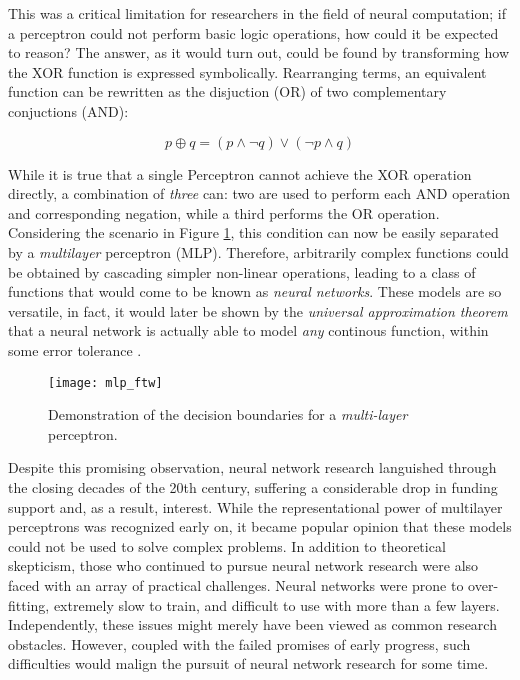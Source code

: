 This was a critical limitation for researchers in the field of neural computation; if a perceptron could not perform basic logic operations, how could it be expected to reason?
The answer, as it would turn out, could be found by transforming how the XOR function is expressed symbolically.
Rearranging terms, an equivalent function can be rewritten as the disjuction (OR) of two complementary conjuctions (AND):

\begin{equation}
\label{eq:xor}
p \oplus q = (p \wedge \neg q) \vee (\neg p \wedge q)
\end{equation}

\noindent While it is true that a single Perceptron cannot achieve the XOR operation directly, a combination of \emph{three} can: two are used to perform each AND operation and corresponding negation, while a third performs the OR operation.
Considering the scenario in Figure \ref{fig:mlp_ftw}, this condition can now be easily separated by a \emph{multilayer} perceptron (MLP).
Therefore, arbitrarily complex functions could be obtained by cascading simpler non-linear operations, leading to a class of functions that would come to be known as \emph{neural networks}.
These models are so versatile, in fact, it would later be shown by the \emph{universal approximation theorem} that a neural network is actually able to model \emph{any} continous function, within some error tolerance \cite{Cybenko1989, Hornik1991}.

\begin{figure}
\begin{centering}
\texttt{[image: mlp\_ftw]}
\caption{Demonstration of the decision boundaries for a \emph{multi-layer} perceptron.}
\label{fig:mlp_ftw}
\end{centering}
\end{figure}

Despite this promising observation, neural network research languished through the closing decades of the 20th century, suffering a considerable drop in funding support and, as a result, interest.
While the representational power of multilayer perceptrons was recognized early on, it became popular opinion that these models could not be used to solve complex problems.
In addition to theoretical skepticism, those who continued to pursue neural network research were also faced with an array of practical challenges.
Neural networks were prone to over-fitting, extremely slow to train, and difficult to use with more than a few layers.
Independently, these issues might merely have been viewed as common research obstacles.
However, coupled with the failed promises of early progress, such difficulties would malign the pursuit of neural network research for some time.


